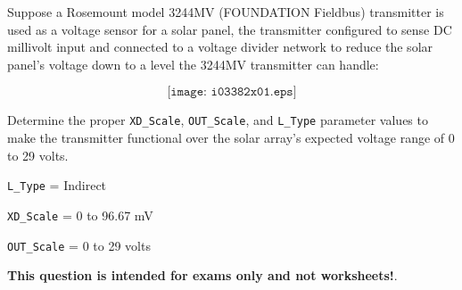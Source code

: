 

Suppose a Rosemount model 3244MV (FOUNDATION Fieldbus) transmitter is used as a voltage sensor for a solar panel, the transmitter configured to sense DC millivolt input and connected to a voltage divider network to reduce the solar panel's voltage down to a level the 3244MV transmitter can handle:

$$\texttt{[image: i03382x01.eps]}$$

Determine the proper {\tt XD\_Scale}, {\tt OUT\_Scale}, and {\tt L\_Type} parameter values to make the transmitter functional over the solar array's expected voltage range of 0 to 29 volts.







{\tt L\_Type} = Indirect

\vskip 10pt

{\tt XD\_Scale} = 0 to 96.67 mV

\vskip 10pt

{\tt OUT\_Scale} = 0 to 29 volts







{\bf This question is intended for exams only and not worksheets!}.



